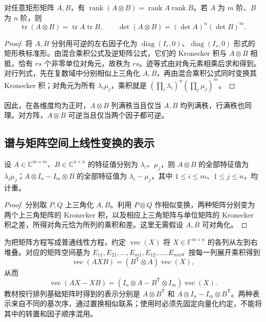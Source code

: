 \begin{proposition}
\label{prop:xie-ex-eig-kronecker-rank}
对任意矩形矩阵 $A,B$，有 $\operatorname{rank}(A\otimes B)=\operatorname{rank}A\operatorname{rank}B$。若 $A$ 为 $m$ 阶、$B$ 为 $n$ 阶，则
\[
\operatorname{tr}(A\otimes B)=\operatorname{tr}A\operatorname{tr}B,\qquad
\det(A\otimes B)=(\det A)^n(\det B)^m.
\]
\end{proposition}
\begin{proof}
将 $A,B$ 分别用可逆的左右因子化为 $\operatorname{diag}(I_r,0)$、$\operatorname{diag}(I_s,0)$ 形式的矩形秩标准形。由混合乘积公式及逆矩阵公式，它们的 Kronecker 积与 $A\otimes B$ 相抵，恰有 $rs$ 个非零单位对角元，故秩为 $rs$。迹等式由对角元素相乘后求和得到。对行列式，先在复数域中分别相似上三角化 $A,B$，再由混合乘积公式同时变换其 Kronecker 积；对角元为所有 $\lambda_i\mu_j$，乘积就是 $(\prod_i\lambda_i)^n(\prod_j\mu_j)^m$。
\end{proof}

因此，在各维度均为正时，$A\otimes B$ 列满秩当且仅当 $A,B$ 均列满秩，行满秩也同理。对方阵，$A\otimes B$ 可逆当且仅当两个因子都可逆。

\subsection{谱与矩阵空间上线性变换的表示}

\begin{theorem}
\label{thm:xie-ex-eig-kronecker-spectrum}
设 $A\in\mathbb C^{m\times m}$、$B\in\mathbb C^{n\times n}$ 的特征值分别为 $\lambda_i$、$\mu_j$，则 $A\otimes B$ 的全部特征值为 $\lambda_i\mu_j$；$A\otimes I_n-I_m\otimes B$ 的全部特征值为 $\lambda_i-\mu_j$，其中 $1\le i\le m$、$1\le j\le n$，均计重。
\end{theorem}
\begin{proof}
分别取 $P,Q$ 上三角化 $A,B$。利用 $P\otimes Q$ 作相似变换，两种矩阵分别变为两个上三角矩阵的 Kronecker 积，以及相应上三角矩阵与单位矩阵的 Kronecker 积之差，所得对角元恰为所列的乘积和差。这里无需假设 $A,B$ 可对角化。
\end{proof}

为把矩阵方程写成普通线性方程，约定 $\operatorname{vec}(X)$ 将 $X\in\mathbb F^{m\times n}$ 的各列从左到右堆叠。对应的矩阵空间基为 $E_{11},E_{21},\ldots,E_{m1},E_{12},\ldots,E_{mn}$。按每一列展开乘积得到
\begin{equation}
\operatorname{vec}(AXB)=(B^{\mathsf T}\otimes A)\operatorname{vec}(X),
\label{eq:xie-ex-eig-vectorization-product}
\end{equation}
从而
\begin{equation}
\operatorname{vec}(AX-XB)
=(I_n\otimes A-B^{\mathsf T}\otimes I_m)\operatorname{vec}(X).
\label{eq:xie-ex-eig-vectorization-sylvester}
\end{equation}
教材按行排列基础矩阵时得到的表示分别是 $A\otimes B^{\mathsf T}$ 和 $A\otimes I_n-I_m\otimes B^{\mathsf T}$。两种表示来自不同的基次序，通过置换相似联系；使用时必须先固定向量化约定，不能将其中的转置和因子顺序混用。


